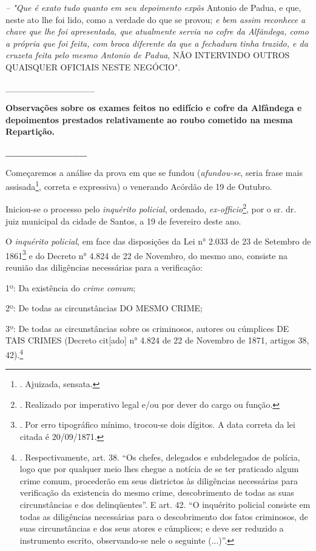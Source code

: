 \emph{-- "Que é exato tudo quanto em seu depoimento expôs} Antonio de
Padua, e que, neste ato lhe foi lido, como a verdade do que se provou;
\emph{e bem assim reconhece a chave que lhe foi apresentada, que
atualmente servia no cofre da Alfândega, como a própria que foi feita,
com broca diferente da que a fechadura tinha trazido, e da cruzeta feita
pelo mesmo Antonio de Padua}, NÃO INTERVINDO OUTROS QUAISQUER OFICIAIS
NESTE NEGÓCIO".

\_\_\_\_\_\_\_\_\_\_\_\_\_\_

\textbf{Observações sobre os exames feitos no edifício e cofre da
Alfândega e depoimentos prestados relativamente ao roubo cometido na
mesma Repartição.}

\textbf{\_\_\_\_\_\_\_\_\_\_\_}

Começaremos a análise da prova em que se fundou (\emph{afundou-se},
seria frase mais assisada\footnote{. Ajuizada, sensata.}, correta e
expressiva) o venerando Acórdão de 19 de Outubro.

Iniciou-se o processo pelo \emph{inquérito policial}, ordenado,
\emph{ex-officio}\footnote{. Realizado por imperativo legal e/ou por
  dever do cargo ou função.}, por o sr. dr. juiz municipal da cidade de
Santos, a 19 de fevereiro deste ano.

O \emph{inquérito policial}, em face das disposições da Lei n° 2.033 de
23 de Setembro de 1861\footnote{. Por erro tipográfico mínimo, trocou-se
  dois dígitos. A data correta da lei citada é 20/09/1871.} e do Decreto
n° 4.824 de 22 de Novembro, do mesmo ano, consiste na reunião das
diligências necessárias para a verificação:

1º: Da existência do \emph{crime comum};

2º: De todas as circunstâncias DO MESMO CRIME;

3º: De todas as circunstâncias sobre os criminosos, autores ou cúmplices
DE TAIS CRIMES (Decreto cit{[}ado{]} n° 4.824 de 22 de Novembro de 1871,
artigos 38, 42).\footnote{. Respectivamente, art. 38. ``Os chefes,
  delegados e subdelegados de polícia, logo que por qualquer meio lhes
  chegue a notícia de se ter praticado algum crime comum, procederão em
  seus districtos às diligências necessárias para verificação da
  existencia do mesmo crime, descobrimento de todas as suas
  circunstâncias e dos delinqüentes''. E art. 42. ``O inquérito policial
  consiste em todas as diligências necessárias para o descobrimento dos
  fatos criminosos, de suas circunstâncias e dos seus atores e
  cúmplices; e deve ser reduzido a instrumento escrito, observando-se
  nele o seguinte (...)''.}

